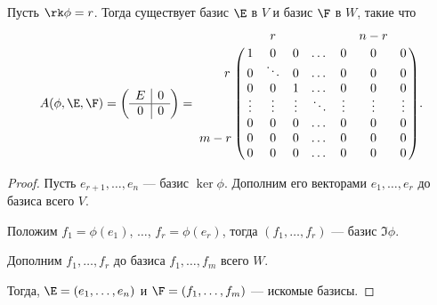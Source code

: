 \documentclass[a4paper]{article}
\begin{document}
\begin{colloq}
            \begin{proposal}
                Пусть $\rk \phi = r$. Тогда существует базис $\E$ в $V$ и базис $\F$ в $W$, такие что
                \begin{equation*}
                    A(\phi, \E, \F) = \left(
                        \begin{array}{c|c}
                            E & 0 \\
                            \hline
                            0 & 0
                        \end{array}
                    \right) = \bordermatrix{    
                        &   & r &   &   &   & n - r &   \cr
                        & 1 & 0 & 0 & \dots & 0 & 0 & 0 \cr
                      \hspace{0.7cm} r & 0 & \ddots & 0 & \dots & 0 & 0 & 0 \cr
                        & 0 & 0 & 1 & \dots & 0 & 0 & 0 \cr
                        & \vdots & \vdots & \vdots & \ddots & \vdots & \vdots & \vdots \cr
                        & 0 & 0 & 0 & \dots & 0 & 0 & 0 \cr
                  m - r & 0 & 0 & 0 & \dots & 0 & 0 & 0 \cr
                        & 0 & 0 & 0 & \dots & 0 & 0 & 0
                    }
                .\end{equation*}
            \end{proposal}

            \begin{proof}
                Пусть $e_{r + 1}, \dots, e_n$ --- базис $\ker \phi$. Дополним его векторами $e_1, \dots, e_r$ до базиса всего $V$.

                Положим $f_1 = \phi(e_1)$, $\dots$, $f_r = \phi(e_r)$, тогда $(f_1, \dots, f_r)$ --- базис $\Im \phi$.

                Дополним $f_1, \dots, f_r$ до базиса $f_1, \dots, f_m$ всего $W$.

                Тогда, $\E = (e_1, \dots, e_n)$ и $\F = (f_1, \dots, f_m)$ --- искомые базисы.
            \end{proof}

    \end{colloq}
\end{document}
